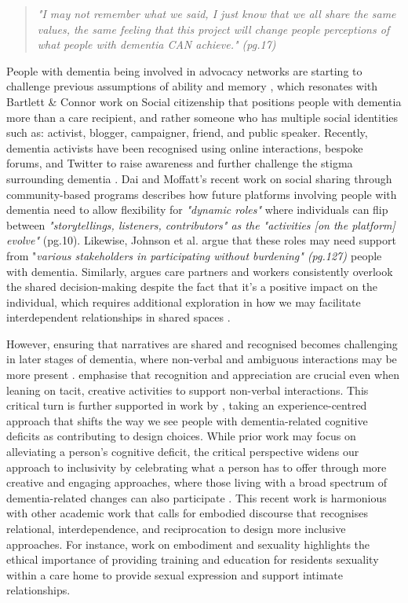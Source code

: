 \begin{quote}
\textit{"I may not remember what we said, I just know that we all share the same values, the same feeling that this project will change people perceptions of what people with dementia CAN achieve." \citep{davies2021dementia}(pg.17)}
    
\end{quote}

People with dementia being involved in advocacy networks are starting to challenge previous assumptions of ability and memory \citep{bartlett_citizenship_2014}, which resonates with Bartlett \& Connor work on Social citizenship that positions people with dementia more than a care recipient, and rather someone who has multiple social identities such as: activist, blogger, campaigner, friend, and public speaker. Recently, dementia activists have been recognised using online interactions, bespoke forums, and Twitter to raise awareness and further challenge the stigma surrounding dementia \citep{talbot_how_2020}. Dai and Moffatt's recent work on social sharing through community-based programs describes how future platforms involving people with dementia need to allow flexibility for \textit{"dynamic roles" }where individuals can flip between \textit{"storytellings, listeners, contributors" as the "activities [on the platform] evolve"} \citep{dai2020making} (pg.10). Likewise, Johnson et al. argue that these roles may need support from "\textit{various stakeholders in participating without burdening" (pg.127)  \citep{johnson_older_2019, johnson2020roles}} people with dementia. Similarly, \cite{daly2018shared} argues care partners and workers consistently overlook the shared decision-making despite the fact that it's a positive impact on the individual, which requires additional exploration in how we may facilitate interdependent relationships in shared spaces . 

However, ensuring that narratives are shared and recognised becomes challenging in later stages of dementia, where non-verbal and ambiguous interactions may be more present \citep{villar_giving_2019}. \cite{treadaway_sensor_2016} emphasise that recognition and appreciation are crucial even when leaning on tacit, creative activities to support non-verbal interactions. This critical turn is further supported in work by \cite{morrissey_value_2017}, taking an experience-centred approach that shifts the way we see people with dementia-related cognitive deficits as contributing to design choices. While prior work may focus on alleviating a person's cognitive deficit, the critical perspective widens our approach to inclusivity by celebrating what a person has to offer through more creative and engaging approaches, where those living with a broad spectrum of dementia-related changes can also participate \citep{lazar_critical_2017}. This recent work is harmonious with other academic work that calls for embodied discourse that recognises relational, interdependence, and reciprocation to design more inclusive approaches. For instance, \cite{kontos_citizenship_2016} work on embodiment and sexuality highlights the ethical importance of providing training and education for residents sexuality within a care home to provide sexual expression and support intimate relationships.

